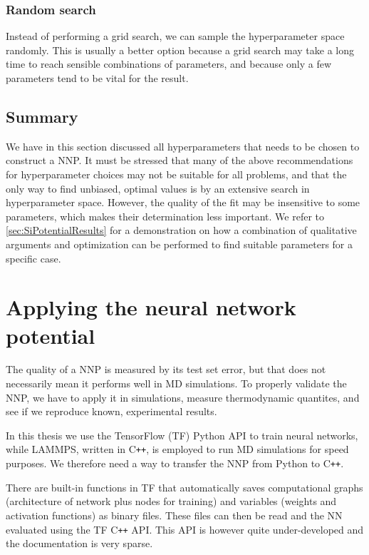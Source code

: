 \documentclass[twoside,english]{uiofysmaster}
\begin{document}
\subsubsection{Random search}
Instead of performing a grid search, we can sample the hyperparameter space randomly. This is usually a better option because 
a grid search may take a long time to reach sensible combinations of parameters, and because only a few parameters
tend to be vital for the result. 

\subsection{Summary}
We have in this section discussed all hyperparameters that needs to be chosen to construct a NNP. 
It must be stressed that many of the above recommendations for hyperparameter choices may not be suitable 
for all problems, and that the only way to find unbiased, optimal values is by an extensive search 
in hyperparameter space. However, the quality of the fit may be insensitive to some parameters, which makes their 
determination less important. 
We refer to \autoref{sec:SiPotentialResults} for a demonstration on how 
a combination of qualitative arguments and optimization can be performed to find suitable parameters 
for a specific case. 



\section{Applying the neural network potential} \label{sec:applyingNNP}
The quality of a NNP is measured by its test set error, but that does not necessarily mean it performs 
well in MD simulations. To properly validate the NNP, we have to apply it in simulations, measure thermodynamic quantites, 
and see if we reproduce known, experimental results. 

In this thesis we use the TensorFlow (TF) Python API to train neural networks, while LAMMPS, written in C\texttt{++}, is
employed to run MD simulations for speed purposes. 
We therefore need a way to transfer the NNP from Python to C\texttt{++}. 

There are built-in functions in TF that automatically saves computational graphs (architecture of network plus
nodes for training) and variables (weights and activation functions) as binary files.
These files can then be read and the NN evaluated using the TF C\texttt{++} API. This API is however quite under-developed
and the documentation is very sparse. 
\end{document}
